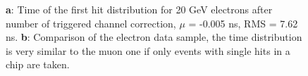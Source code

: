 \begin{figure}[htbp]
	\hfill
	\caption[]{\textbf{a}: Time of the first hit distribution for 20 GeV electrons after number of triggered channel correction, $\mu$ = -0.005 ns, RMS = 7.62 ns. \textbf{b}: Comparison of the electron data sample, the time distribution is very similar to the muon one if only events with single hits in a chip are taken.}
\end{figure}

